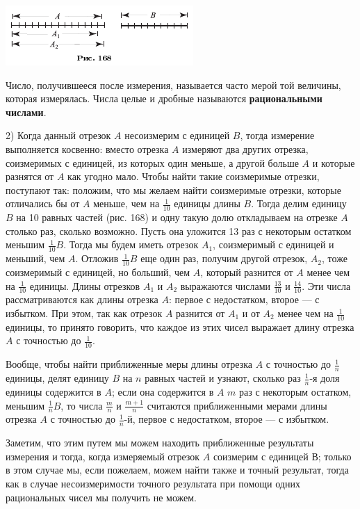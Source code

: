 \documentclass[oneside]{book}
\begin{document}
\includegraphics{pics/ris-168}

Число, получившееся после измерения, называется часто мерой той величины, которая измерялась.
Числа целые и дробные называются \textbf{рациональными числами}.

2) Когда данный отрезок $A$ несоизмерим с единицей $B$, тогда измерение выполняется косвенно:
вместо отрезка $A$ измеряют два других отрезка, соизмеримых с единицей, из которых один меньше, а другой больше $A$ и которые разнятся от $A$ как угодно мало.
Чтобы найти такие соизмеримые отрезки, поступают так:
положим, что мы желаем найти соизмеримые отрезки, которые отличались бы от $A$ меньше, чем на
$\tfrac1{10}$ единицы длины $B$.
Тогда делим единицу $B$ на 10 равных частей (рис. 168) и одну такую долю откладываем на отрезке $A$ столько раз, сколько возможно.
Пусть она уложится 13 раз с некоторым остатком меньшим $\tfrac1{10}B$.
Тогда мы будем иметь отрезок $A_1$, соизмеримый с единицей и меньший, чем $A$.
Отложив $\tfrac1{10}B$ еще один раз, получим другой отрезок, $A_2$, тоже соизмеримый с единицей, но больший, чем $A$, который разнится от $A$ менее чем на $\tfrac1{10}$ единицы.
Длины отрезков $A_1$ и $A_2$ выражаются числами $\tfrac{13}{10}$ и $\tfrac{14}{10}$.
Эти числа рассматриваются как  длины отрезка $A$:
первое с недостатком, второе — с избытком.
При этом, так как отрезок $A$ разнится от $A_1$ и от $A_2$ менее чем на $\tfrac1{10}$ единицы, то принято говорить, что каждое из этих чисел выражает длину отрезка $A$ с точностью до $\tfrac1{10}$.

Вообще, чтобы найти приближенные меры длины отрезка $A$ с точностью до $\tfrac1n$ единицы, делят единицу $B$ на $n$ равных частей и узнают, сколько раз $\tfrac1n$-я %
доля единицы содержится в $A$;
если она содержится в $A$ $m$ %
раз с некоторым остатком, меньшим $\tfrac1n B$, то числа $\tfrac mn$ и $\tfrac {m+1}n$ считаются приближенными мерами длины отрезка $A$ с точностью до $\tfrac1n$-й, первое с недостатком, второе — с избытком.

Заметим, что этим путем мы можем находить приближенные результаты измерения и тогда, когда измеряемый отрезок $A$ соизмерим с единицей В;
только в этом случае мы, если пожелаем, можем найти также и точный результат, тогда как в случае несоизмеримости точного результата при помощи одних рациональных чисел мы получить не можем.
\end{document}
